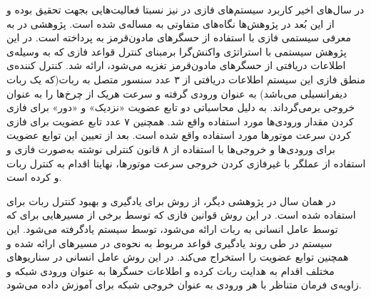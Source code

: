 در سال‌های اخیر کاربرد سیستم‌های فازی در  نیز نسبتا فعالیت‌هایی بجهت تحقیق بوده و از این بُعد در پژوهش‌ها نگاه‌های متفاوتی به مساله‌ی  شده است. پژوهشی در  به معرفی سیستمی فازی با استفاده از حسگرهای مادون‌قرمز به  پرداخته است. در این پژوهش سیستمی با استراتژی واکنش‌گرا برمبنای کنترل قواعد فازی که به وسیله‌ی اطلاعات دریافتی از حسگرهای مادون‌قرمز تغزیه می‌شود، ارائه شد. کنترل کننده‌ی منطق فازی این سیستم اطلاعات دریافتی از ۳ عدد سنسور متصل به ربات(که یک ربات دیفرانسیلی می‌باشد) به عنوان ورودی گرفته و سرعت هریک از چرخ‌ها را به عنوان خروجی برمی‌گرداند. به دلیل محاسباتی دو تابع عضویت «نزدیک» و «دور» برای فازی کردن مقدار ورودی‌ها مورد استفاده واقع شد. همچنین ۷ عدد تابع عضویت برای فازی کردن سرعت موتورها مورد استفاده واقع شده است. بعد از تعیین این توابع عضویت برای ورودی‌ها و خروجی‌ها با استفاده از ۸ قانون کنترلی نوشته به‌صورت فازی و استفاده از عملگر  با غیرفازی کردن خروجی سرعت موتورها، نهایتا اقدام به کنترل ربات و  کرده است.

در همان سال در پژوهشی دیگر، از روش  برای یادگیری و بهبود کنترل ربات برای  استفاده شده است. در این روش قوانین فازی که توسط برخی از مسیرهایی برای  که توسط عامل انسانی به ربات ارائه می‌شود، توسط سیستم  یادگرفته می‌شود. این سیستم در طی روند یادگیری قواعد مربوط به نحوه‌ی  در مسیرهای ارائه شده و همچنین توابع عضویت را استخراج می‌کند. در این روش عامل انسانی در سناریو‌های مختلف اقدام به هدایت ربات کرده و اطلاعات حسگرها به عنوان ورودی شبکه و زاویه‌ی فرمان متناظر با هر ورودی به عنوان خروجی شبکه برای آموزش داده می‌شود.